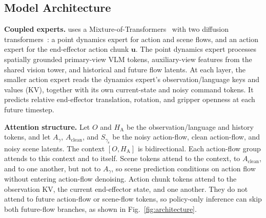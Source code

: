 \vspace{-0.2cm}

\subsection{Model Architecture}
\label{sec:method:architecture}
\vspace{-0.2cm}

\noindent\textbf{Coupled experts.}
\method{} uses a Mixture-of-Transformers~\citep{liang2024mixture}
with two diffusion transformers~\citep{peebles2023scalable}:
a point dynamics expert for action and scene flows, and an action expert for the
end-effector action chunk $\mathbf u$. The point dynamics expert processes spatially grounded
primary-view VLM tokens, auxiliary-view features from the shared vision
tower, and historical and future flow latents. At each layer, the smaller
action expert reads the dynamics expert's observation/language keys and
values (KV), together with its own current-state and noisy command tokens.
It predicts relative end-effector translation, rotation, and gripper
openness at each future timestep.

\noindent\textbf{Attention structure.}
Let $O$ and $H_{\mathrm A}$ be the observation/language and history
tokens, and let $A_\gamma$, $A_{\mathrm{clean}}$, and $S_{\gamma_{\mathrm s}}$
be the noisy action-flow, clean action-flow, and noisy scene latents.
The context $[O,H_{\mathrm A}]$ is bidirectional.
Each action-flow group attends to this context and to itself.
Scene tokens attend to the context, to $A_{\mathrm{clean}}$, and to one
another, but not to $A_\gamma$, so scene prediction conditions on action
flow without entering action-flow denoising.
Action chunk tokens attend to the observation KV, the current end-effector
state, and one another.
They do not attend to future action-flow or scene-flow tokens, so
policy-only inference can skip both future-flow branches, as shown in
Fig.~\ref{fig:architecture}.


